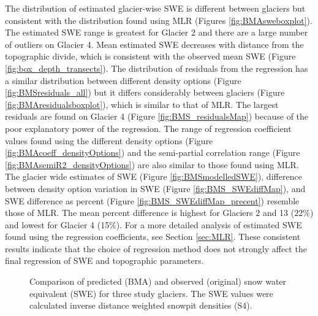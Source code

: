 \documentclass{sfuthesis}
\begin{document}
The distribution of estimated glacier-wise SWE is different between glaciers but consistent with the distribution found using MLR (Figures \ref{fig:BMAsweboxplot}). The estimated SWE range is greatest for Glacier 2 and there are a large number of outliers on Glacier 4. Mean estimated SWE decreases with distance from the topographic divide, which is consistent with the observed mean SWE (Figure \ref{fig:box_depth_transects}). The distribution of residuals from the regression has a similar distribution between different density options (Figure \ref{fig:BMSresiduals_all}) but it differs considerably between glaciers (Figure \ref{fig:BMAresidualsboxplot}), which is similar to that of MLR. The largest residuals are found on Glacier 4 (Figure \ref{fig:BMS_residualsMap}) because of the poor explanatory power of the regression. The range of regression coefficient values found using the different density options (Figure \ref{fig:BMAcoeff_densityOptions}) and the semi-partial correlation range (Figure \ref{fig:BMAsemiR2_densityOptions}) are also similar to those found using MLR. The glacier wide estimates of SWE (Figure \ref{fig:BMSmodelledSWE}), difference between density option variation in SWE (Figure \ref{fig:BMS_SWEdiffMap}), and SWE difference as percent (Figure \ref{fig:BMS_SWEdiffMap_precent}) resemble those of MLR. The mean percent difference is highest for Glaciers 2 and 13 (22\%) and lowest for Glacier 4 (15\%).  For a more detailed analysis of estimated SWE found using the regression coefficients, see Section \ref{sec:MLR}. These consistent results indicate that the choice of regression method does not strongly affect the final regression of SWE and topographic parameters.


\begin{figure}[H]
	\caption{Comparison of predicted (BMA) and observed (original) snow water equivalent (SWE) for three study glaciers. The SWE values were calculated inverse distance weighted snowpit densities (S4).}
	\label{fig:BMSfit_opt8}
\end{figure}
\end{document}
